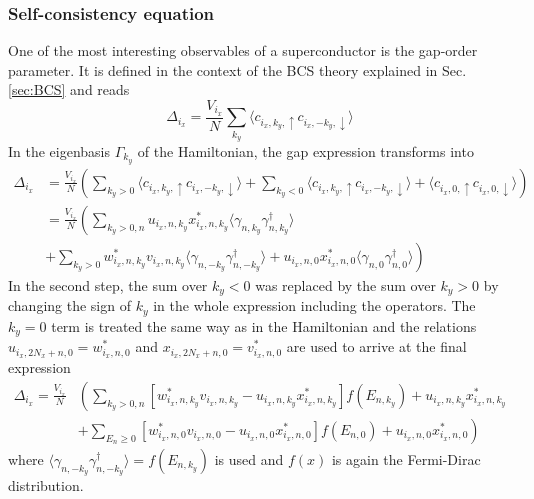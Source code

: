 \subsubsection{Self-consistency equation}\label{sec:num_gap}
One of the most interesting observables of a superconductor is the gap-order parameter.
It is defined in the context of the BCS theory explained in Sec. \ref{sec:BCS} and reads
\begin{equation}
    \nonumber
    \Delta_{i_x} = \frac{V_{i_x}}{N} \sum_{k_y} \langle c_{i_x, k_y, \uparrow}c_{i_x, -k_y, \downarrow}\rangle
\end{equation}
In the eigenbasis $\Gamma_{k_y}$ of the Hamiltonian, the gap expression transforms into
\begin{align} \nonumber
    \Delta_{i_x} &= \frac{V_{i_x}}{N}\left( \sum_{k_y >0} \langle c_{i_x, k_y, \uparrow}c_{i_x, -k_y, \downarrow}\rangle  +\sum_{k_y <0} \langle c_{i_x, k_y, \uparrow}c_{i_x, -k_y, \downarrow}\rangle + \langle c_{i_x,0, \uparrow}c_{i_x, 0, \downarrow}\rangle \right) \\ \nonumber
    &= \frac{V_{i_x}}{N}\left( \sum_{k_y >0,n} u_{i_x,n,k_y}x^*_{i_x,n,k_y}\langle \gamma_{n, k_y}\gamma^{\dag}_{n, k_y}\rangle  \right. \\ \nonumber
    &\left.+\sum_{k_y >0} w^*_{i_x,n,k_y}v_{i_x,n,k_y}\langle \gamma_{n, -k_y}\gamma^{\dag}_{n, -k_y}\rangle + u_{i_x,n,0}x^*_{i_x,n,0}\langle \gamma_{n, 0}\gamma^{\dag}_{n, 0}\rangle \right)
\end{align}
In the second step, the sum over $k_y<0$ was replaced by the sum over $k_y>0$ by changing the sign of $k_y$ in the whole expression including the operators.
The $k_y=0$ term is treated the same way as in the Hamiltonian and the relations $u_{i_x,2N_x+n,0} = w^*_{i_x, n,0}$ and $x_{i_x,2N_x+n,0} = v^*_{i_x, n,0}$ are used to arrive at the final expression
\begin{align} \nonumber
    \Delta_{i_x} = \frac{V_{i_x}}{N} &\left( \sum_{k_y >0,n} \left[ w^*_{i_x,n,k_y}v_{i_x,n,k_y}-u_{i_x,n,k_y}x^*_{i_x,n,k_y}\right]f(E_{n,k_y}) +u_{i_x,n,k_y}x^*_{i_x,n,k_y} \right. \\
    &+ \left.\sum_{E_n \geq0} \left[ w^*_{i_x,n,0}v_{i_x,n,0}-u_{i_x,n,0}x^*_{i_x,n,0}\right]f(E_{n,0})+ u_{i_x,n,0}x^*_{i_x,n,0} \right) \label{eq:gap_singlet_num}
\end{align}
where $\langle \gamma_{n, -k_y}\gamma^{\dag}_{n, -k_y}\rangle=f(E_{n,k_y})$ is used and $f(x)$ is again the Fermi-Dirac distribution. \newline
